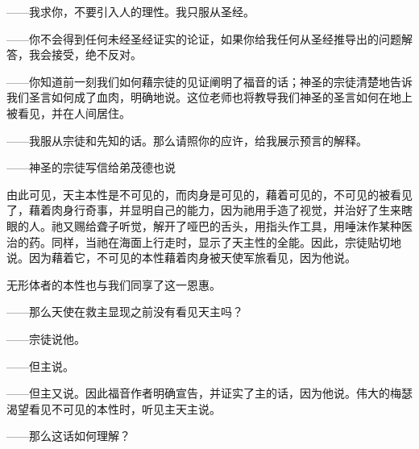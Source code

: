 ——我求你，不要引入人的理性。我只服从圣经。\par

——你不会得到任何未经圣经证实的论证，如果你给我任何从圣经推导出的问题解答，我会接受，绝不反对。\par

——你知道前一刻我们如何藉宗徒的见证阐明了福音的话；神圣的宗徒清楚地告诉我们圣言如何成了血肉，明确地说。这位老师也将教导我们神圣的圣言如何在地上被看见，并在人间居住。\par

——我服从宗徒和先知的话。那么请照你的应许，给我展示预言的解释。\par

——神圣的宗徒写信给弟茂德也说\par

由此可见，天主本性是不可见的，而肉身是可见的，藉着可见的，不可见的被看见了，藉着肉身行奇事，并显明自己的能力，因为祂用手造了视觉，并治好了生来瞎眼的人。祂又赐给聋子听觉，解开了哑巴的舌头，用指头作工具，用唾沫作某种医治的药。同样，当祂在海面上行走时，显示了天主性的全能。因此，宗徒贴切地说。因为藉着它，不可见的本性藉着肉身被天使军旅看见，因为他说。\par

无形体者的本性也与我们同享了这一恩惠。\par

——那么天使在救主显现之前没有看见天主吗？\par

——宗徒说他。\par

——但主说。\par

——但主又说。因此福音作者明确宣告，并证实了主的话，因为他说。伟大的梅瑟渴望看见不可见的本性时，听见主天主说。\par

——那么这话如何理解？\par

